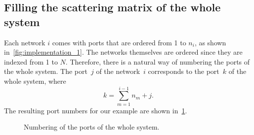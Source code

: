 
\subsection{Filling the scattering matrix of the whole system}

Each network $i$ comes with ports that are ordered from 1 to $n_i$, as shown in~\cref{fig:implementation_1}.
The networks themselves are ordered since they are indexed from 1 to $N$.
Therefore, there is a natural way of numbering the ports of the whole system.
The port~$j$ of the network~$i$ corresponds to the port~$k$ of the whole system, where
\begin{equation}
    k = \sum_{m=1}^{i - 1}n_m + j\text{.} \label{eq:port_numbering}
\end{equation}
The resulting port numbers for our example are shown in~\cref{fig:implementation_2}.

\begin{figure}[hbtp]
    \centering
    
    \caption{Numbering of the ports of the whole system.}
    \label{fig:implementation_2}
\end{figure}

